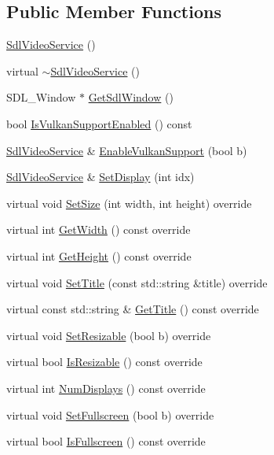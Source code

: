 \subsection*{Public Member Functions}
\begin{DoxyCompactItemize}
\item 
\hyperlink{classastu_1_1SdlVideoService_a21f04798e41b0c5c083acc1eefcbb5c1}{Sdl\+Video\+Service} ()
\item 
virtual \hyperlink{classastu_1_1SdlVideoService_a5ab48fd8569c517151099d71a86cc0b5}{$\sim$\+Sdl\+Video\+Service} ()
\item 
S\+D\+L\+\_\+\+Window $\ast$ \hyperlink{classastu_1_1SdlVideoService_af0282450cc95c0cbc2a6add84603dd7a}{Get\+Sdl\+Window} ()
\item 
bool \hyperlink{classastu_1_1SdlVideoService_aa40bb996597ad6c1005ce9dfd632cf28}{Is\+Vulkan\+Support\+Enabled} () const
\item 
\hyperlink{classastu_1_1SdlVideoService}{Sdl\+Video\+Service} \& \hyperlink{classastu_1_1SdlVideoService_a1ffb1c36698630d153b50b37cb1bcaee}{Enable\+Vulkan\+Support} (bool b)
\item 
\hyperlink{classastu_1_1SdlVideoService}{Sdl\+Video\+Service} \& \hyperlink{classastu_1_1SdlVideoService_a46fe8816a8975a2d6cd7311bdbd46167}{Set\+Display} (int idx)
\item 
virtual void \hyperlink{classastu_1_1SdlVideoService_a1c8d729ef42024bc0cc5065ecc6631c8}{Set\+Size} (int width, int height) override
\item 
virtual int \hyperlink{classastu_1_1SdlVideoService_a45c3181611e718bcfe44862baed6d520}{Get\+Width} () const override
\item 
virtual int \hyperlink{classastu_1_1SdlVideoService_a76d0f56254c9545d4d9762349133d4af}{Get\+Height} () const override
\item 
virtual void \hyperlink{classastu_1_1SdlVideoService_aad3c873db481dd622d6ddcea70b279af}{Set\+Title} (const std\+::string \&title) override
\item 
virtual const std\+::string \& \hyperlink{classastu_1_1SdlVideoService_ad6ee7f7a409960e91ddd77bbcea6432f}{Get\+Title} () const override
\item 
virtual void \hyperlink{classastu_1_1SdlVideoService_ab50969b38dedf29146704898a74df5ae}{Set\+Resizable} (bool b) override
\item 
virtual bool \hyperlink{classastu_1_1SdlVideoService_a335762da99b341205b8bf759a0b57c64}{Is\+Resizable} () const override
\item 
virtual int \hyperlink{classastu_1_1SdlVideoService_a3aefc8ab3780a23cdef8780e42436fd5}{Num\+Displays} () const override
\item 
virtual void \hyperlink{classastu_1_1SdlVideoService_a45a37b4958f6e77e22ffa55699a171ef}{Set\+Fullscreen} (bool b) override
\item 
virtual bool \hyperlink{classastu_1_1SdlVideoService_ae2be9aedf021799802cf7d1feaef7dfc}{Is\+Fullscreen} () const override
\end{DoxyCompactItemize}
